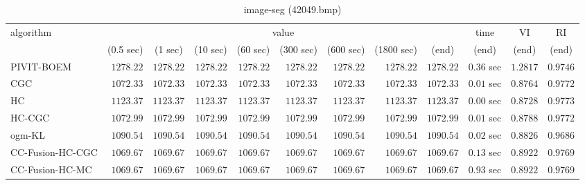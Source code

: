 \begin{table}[H]
\scriptsize
\centering
\caption{image-seg (42049.bmp)}
\label{tab:anytimetable-image-seg-42049.bmp}
\begin{tabular}{lrrrrrrrrrrr}
\toprule
           algorithm &                                   \multicolumn{8}{c}{value} & \multicolumn{1}{c}{time}    & \multicolumn{1}{c}{VI}  & \multicolumn{1}{c}{RI} \\  
\cmidrule(lr){2-9}\cmidrule(lr){10-10} \cmidrule(lr){11-11} \cmidrule(lr){12-12}   
                     & \multicolumn{1}{c}{(0.5 sec)} & \multicolumn{1}{c}{(1 sec)} & \multicolumn{1}{c}{(10 sec)} & \multicolumn{1}{c}{(60 sec)} & \multicolumn{1}{c}{(300 sec)} & \multicolumn{1}{c}{(600 sec)} & \multicolumn{1}{c}{(1800 sec)} & \multicolumn{1}{c}{(end)} & \multicolumn{1}{c}{(end)}    & \multicolumn{1}{c}{(end)}   & \multicolumn{1}{c}{(end)}  \\ \midrule 
          PIVIT-BOEM & $      1278.22$ & $      1278.22$ & $      1278.22$ & $      1278.22$ & $      1278.22$ & $      1278.22$ & $      1278.22$ & $      1278.22$ & $         0.36$ sec    & $       1.2817$  & $       0.9746$ \\ 
                 CGC & $      1072.33$ & $      1072.33$ & $      1072.33$ & $      1072.33$ & $      1072.33$ & $      1072.33$ & $      1072.33$ & $      1072.33$ & $         0.01$ sec    & $       0.8764$  & $       0.9772$ \\ 
                  HC & $      1123.37$ & $      1123.37$ & $      1123.37$ & $      1123.37$ & $      1123.37$ & $      1123.37$ & $      1123.37$ & $      1123.37$ & $         0.00$ sec    & $       0.8728$  & $       0.9773$ \\ 
              HC-CGC & $      1072.99$ & $      1072.99$ & $      1072.99$ & $      1072.99$ & $      1072.99$ & $      1072.99$ & $      1072.99$ & $      1072.99$ & $         0.01$ sec    & $       0.8788$  & $       0.9772$ \\ 
              ogm-KL & $      1090.54$ & $      1090.54$ & $      1090.54$ & $      1090.54$ & $      1090.54$ & $      1090.54$ & $      1090.54$ & $      1090.54$ & $         0.02$ sec    & $       0.8826$  & $       0.9686$ \\ 
    CC-Fusion-HC-CGC & $      1069.67$ & $      1069.67$ & $      1069.67$ & $      1069.67$ & $      1069.67$ & $      1069.67$ & $      1069.67$ & $      1069.67$ & $         0.13$ sec    & $       0.8922$  & $       0.9769$ \\ 
     CC-Fusion-HC-MC & $      1069.67$ & $      1069.67$ & $      1069.67$ & $      1069.67$ & $      1069.67$ & $      1069.67$ & $      1069.67$ & $      1069.67$ & $         0.93$ sec    & $       0.8922$  & $       0.9769$ \\ 

\end{tabular}
\end{table}
